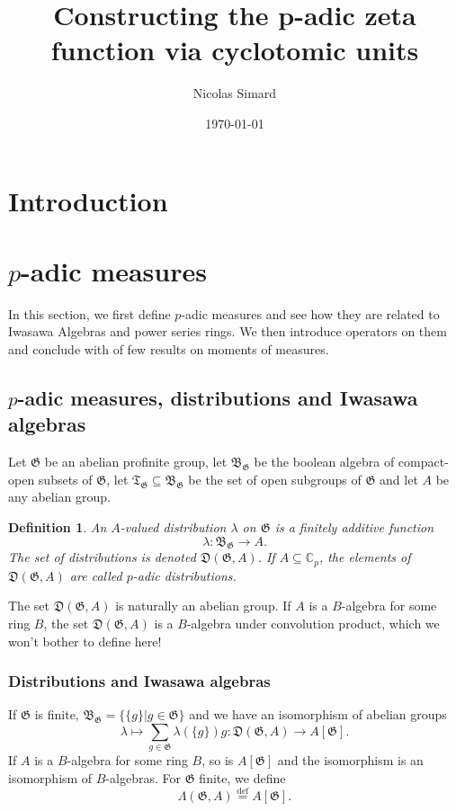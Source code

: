 \documentclass[twoside,10pt]{article}
\author{Nicolas Simard}
\date{\today}
\title{Constructing the p-adic zeta function via cyclotomic units}
\newtheorem{defn}{Definition}
\newcommand{\rarr}{\rightarrow}
\newcommand{\C}{\mathbb{C}}
\newcommand{\T}{\mathfrak{T}}
\newcommand{\B}{\mathfrak{B}}
\newcommand{\Gfrak}{\mathfrak{G}}
\newcommand{\eqdef}{\overset{\text{def}}{=}}
\newcommand{\Dist}{\mathfrak{D}}
\begin{document}
\maketitle
\tableofcontents

\section*{Introduction}

\section{$p$-adic measures}
In this section, we first define $p$-adic measures and see how they are related to Iwasawa Algebras and power series rings. We then introduce operators on them and conclude with of few results on moments of measures.

\subsection{$p$-adic measures, distributions and Iwasawa algebras}
Let $\Gfrak$ be an abelian profinite group, let $\B_\Gfrak$ be the boolean algebra of compact-open subsets of $\Gfrak$, let $\T_\Gfrak\subseteq\B_\Gfrak$ be the set of open subgroups of $\Gfrak$ and let $A$ be any abelian group.

\begin{defn}
	An $A$-valued distribution $\lambda$ on $\Gfrak$ is a finitely additive function
	\[\lambda:\B_\Gfrak\rarr A.\]
	The set of distributions is denoted $\Dist(\Gfrak,A)$. If $A\subseteq\C_p$, the elements of $\Dist(\Gfrak,A)$ are called $p$-adic distributions.
\end{defn}

The set $\Dist(\Gfrak,A)$ is naturally an abelian group. If $A$ is a $B$-algebra for some ring $B$, the set $\Dist(\Gfrak,A)$ is a $B$-algebra under convolution product, which we won't bother to define here!

\subsubsection*{Distributions and Iwasawa algebras}
If $\Gfrak$ is finite, $\B_\Gfrak = \{\{g\}|g\in\Gfrak\}$ and we have an isomorphism of abelian groups
\[\lambda\mapsto\sum_{g\in\Gfrak}\lambda(\{g\})g:\Dist(\Gfrak,A)\rightarrow A[\Gfrak].\]
If $A$ is a $B$-algebra for some ring $B$, so is $A[\Gfrak]$ and the isomorphism is an isomorphism of $B$-algebras. For $\Gfrak$ finite, we define
\[\Lambda(\Gfrak,A)\eqdef A[\Gfrak].\]
\end{document}
